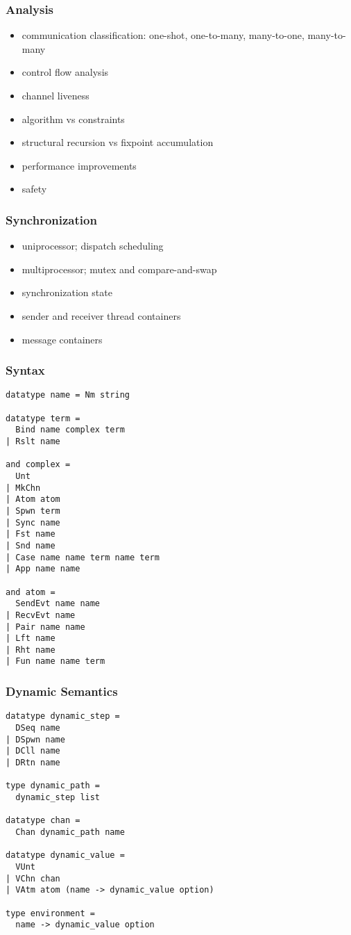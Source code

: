 \documentclass{beamer}
\begin{document}
\begin{frame}
\frametitle{Analysis}
\begin{itemize}
\item communication classification: one-shot, one-to-many, many-to-one, many-to-many
\item control flow analysis
\item channel liveness
\item algorithm vs constraints
\item structural recursion vs fixpoint accumulation
\item performance improvements
\item safety
\end{itemize}
\end{frame}


\begin{frame}
\frametitle{Synchronization}
\begin{itemize}
\item uniprocessor; dispatch scheduling
\item multiprocessor; mutex and compare-and-swap
\item synchronization state
\item sender and receiver thread containers
\item message containers
\end{itemize}
\end{frame}



\begin{frame}[fragile]
	\frametitle{Syntax}
\begin{lstlisting}[language=logic, mathescape]
datatype name = Nm string

datatype term = 
  Bind name complex term 
| Rslt name

and complex = 
  Unt
| MkChn
| Atom atom
| Spwn term 
| Sync name
| Fst name
| Snd name
| Case name name term name term 
| App name name

and atom = 
  SendEvt name name
| RecvEvt name
| Pair name name
| Lft name
| Rht name
| Fun name name term 
\end{lstlisting}
\end{frame}



\begin{frame}[fragile]
	\frametitle{Dynamic Semantics}
\begin{lstlisting}[language=logic, mathescape]
datatype dynamic_step =
  DSeq name
| DSpwn name
| DCll name
| DRtn name 

type dynamic_path =
  dynamic_step list

datatype chan =
  Chan dynamic_path name 

datatype dynamic_value = 
  VUnt
| VChn chan
| VAtm atom (name -> dynamic_value option)

type environment =
  name -> dynamic_value option
\end{lstlisting}
\end{frame}
\end{document}
